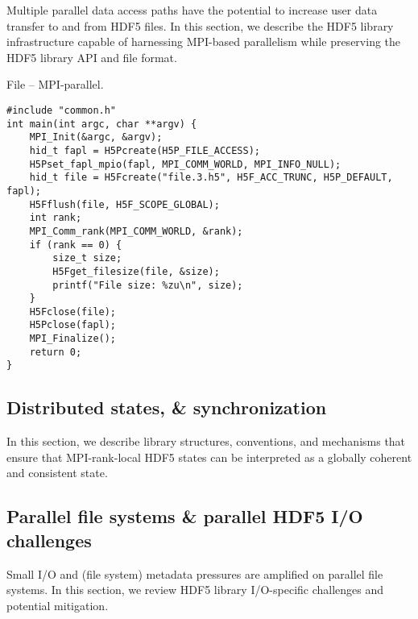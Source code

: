 


Multiple parallel data access paths have the potential to increase user data transfer to and from HDF5 files. In this section, we describe the HDF5 library infrastructure capable of harnessing MPI-based parallelism while preserving the HDF5 library API and file format.

\begin{listing}
\centering
\caption{File -- MPI-parallel.}
\label{lst:file-mpi-parallel}
\begin{verbatim}
#include "common.h"
int main(int argc, char **argv) {
    MPI_Init(&argc, &argv);
    hid_t fapl = H5Pcreate(H5P_FILE_ACCESS);
    H5Pset_fapl_mpio(fapl, MPI_COMM_WORLD, MPI_INFO_NULL);
    hid_t file = H5Fcreate("file.3.h5", H5F_ACC_TRUNC, H5P_DEFAULT, fapl);
    H5Fflush(file, H5F_SCOPE_GLOBAL);
    int rank;
    MPI_Comm_rank(MPI_COMM_WORLD, &rank);
    if (rank == 0) {
        size_t size;
        H5Fget_filesize(file, &size);
        printf("File size: %zu\n", size);
    }
    H5Fclose(file);
    H5Pclose(fapl);
    MPI_Finalize();
    return 0;
}
\end{verbatim}
\end{listing}

\subsection{Distributed states, \& synchronization}\label{sec:MPI-state-n-sync}

In this section, we describe library structures, conventions, and mechanisms that ensure that MPI-rank-local HDF5 states can be interpreted as a globally coherent and consistent state.

\subsection{Parallel file systems \& parallel HDF5 I/O challenges}

Small I/O and (file system) metadata pressures are amplified on parallel file systems. In this section, we review HDF5 library I/O-specific challenges and potential mitigation.

